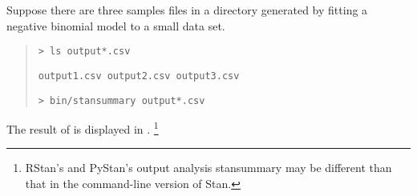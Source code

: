 Suppose there are three samples files in a directory generated by
fitting a negative binomial model to a small data set.
%
\begin{quote}
\begin{Verbatim}[fontshape=sl]
> ls output*.csv
\end{Verbatim}
%
\begin{Verbatim}
output1.csv	output2.csv	output3.csv
\end{Verbatim}
%
\begin{Verbatim}[fontshape=sl]
> bin/stansummary output*.csv
\end{Verbatim}
\end{quote}
%
The result of  is displayed in
.%
%
\footnote{RStan's and PyStan's output analysis stansummary may be different
  than that in the command-line version of Stan.}
%
